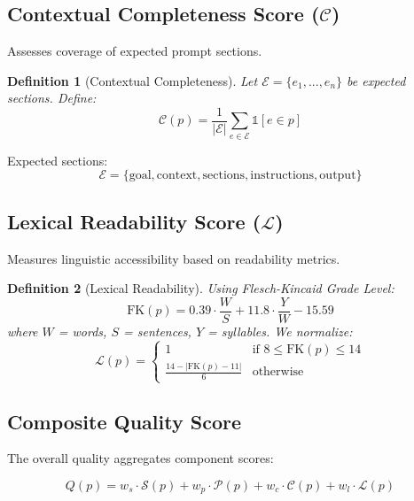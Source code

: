 \documentclass[11pt,a4paper]{article}
\newtheorem{definition}{Definition}
\begin{document}
\subsection{Contextual Completeness Score ($\mathcal{C}$)}

Assesses coverage of expected prompt sections.

\begin{definition}[Contextual Completeness]
Let $\mathcal{E} = \{e_1, ..., e_n\}$ be expected sections. Define:
\begin{equation}
\mathcal{C}(p) = \frac{1}{|\mathcal{E}|} \sum_{e \in \mathcal{E}} \mathbb{1}[e \in p]
\end{equation}
\end{definition}

Expected sections:
\begin{equation}
\mathcal{E} = \{\text{goal}, \text{context}, \text{sections}, \text{instructions}, \text{output}\}
\end{equation}

\subsection{Lexical Readability Score ($\mathcal{L}$)}

Measures linguistic accessibility based on readability metrics.

\begin{definition}[Lexical Readability]
Using Flesch-Kincaid Grade Level:
\begin{equation}
\text{FK}(p) = 0.39 \cdot \frac{W}{S} + 11.8 \cdot \frac{Y}{W} - 15.59
\end{equation}
where $W$ = words, $S$ = sentences, $Y$ = syllables. We normalize:
\begin{equation}
\mathcal{L}(p) = \begin{cases}
1 & \text{if } 8 \leq \text{FK}(p) \leq 14 \\
\frac{14 - |\text{FK}(p) - 11|}{6} & \text{otherwise}
\end{cases}
\end{equation}
\end{definition}

\subsection{Composite Quality Score}

The overall quality aggregates component scores:

\begin{equation}
Q(p) = w_s \cdot \mathcal{S}(p) + w_p \cdot \mathcal{P}(p) + w_c \cdot \mathcal{C}(p) + w_l \cdot \mathcal{L}(p)
\end{equation}
\end{document}
